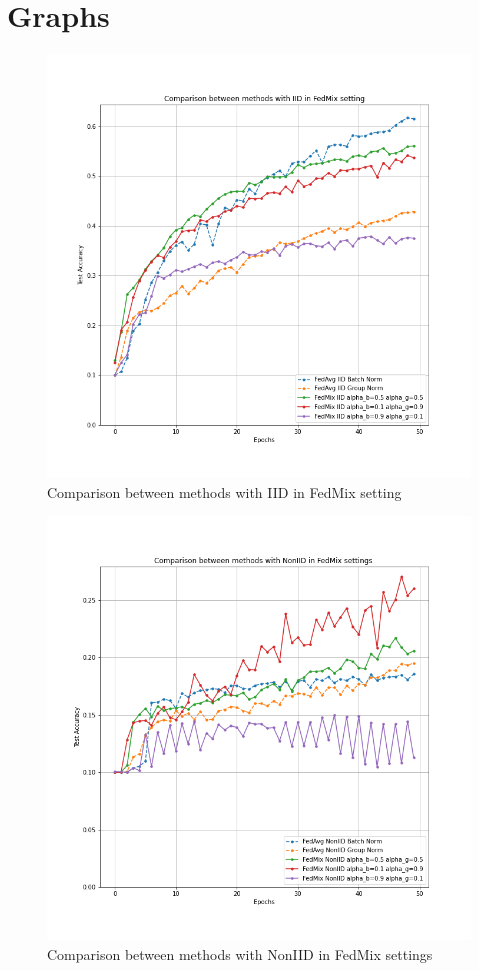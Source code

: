 \documentclass[conference]{IEEEtran}
\begin{document}
\section{Graphs}
\begin{figure}[htb]
    \centering
    \includegraphics[width=\columnwidth]{Images/Comparison between methods with IID in FedMix setting.png}
    \caption{Comparison between methods with IID in FedMix setting}
    \label{fig:appendix1}
\end{figure}
\begin{figure}[htb]
    \centering
    \includegraphics[width=\columnwidth]{Images/Comparison between methods with NonIID in FedMix settings.png}
    \caption{Comparison between methods with NonIID in FedMix settings}
    \label{fig:appendix2}
\end{figure}
\end{document}
